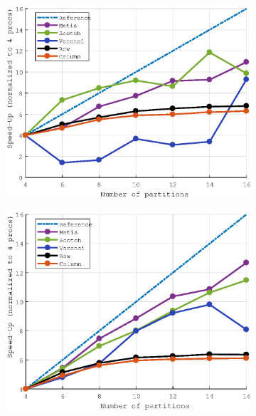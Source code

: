 \documentclass[a4paper,11pt]{article}
\begin{document}
\vspace*{-8mm}
\begin{figure}[H]\ContinuedFloat
	\begin{subfigure}[t]{0.45\textwidth}
		\centering
		\includegraphics[width=\textwidth]{robin_400x400_5_speedup.eps}
	\end{subfigure}
	\hfill
	\begin{subfigure}[t]{0.45\textwidth}
		\centering
		\includegraphics[width=\textwidth]{dirichlet_400x400_5_speedup.eps}
	\end{subfigure}
\end{figure}
\end{document}
